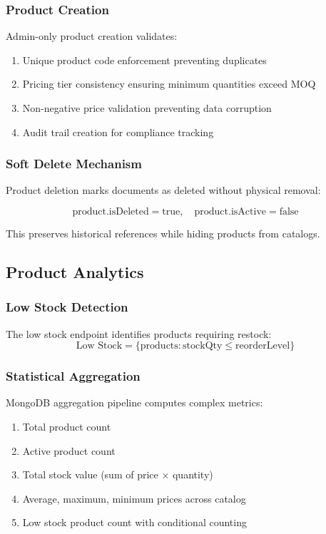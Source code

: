 \documentclass[conference]{IEEEtran}
\begin{document}
\subsubsection{Product Creation}
Admin-only product creation validates:
\begin{enumerate}
\item Unique product code enforcement preventing duplicates
\item Pricing tier consistency ensuring minimum quantities exceed MOQ
\item Non-negative price validation preventing data corruption
\item Audit trail creation for compliance tracking
\end{enumerate}

\subsubsection{Soft Delete Mechanism}
Product deletion marks documents as deleted without physical removal:

\begin{equation}
\text{product.isDeleted} = \text{true}, \quad \text{product.isActive} = \text{false}
\end{equation}

This preserves historical references while hiding products from catalogs.

\subsection{Product Analytics}

\subsubsection{Low Stock Detection}
The low stock endpoint identifies products requiring restock:
\begin{equation}
\text{Low Stock} = \{\text{products} : \text{stockQty} \leq \text{reorderLevel}\}
\end{equation}

\subsubsection{Statistical Aggregation}
MongoDB aggregation pipeline computes complex metrics:
\begin{enumerate}
\item Total product count
\item Active product count
\item Total stock value (sum of price × quantity)
\item Average, maximum, minimum prices across catalog
\item Low stock product count with conditional counting
\end{enumerate}
\end{document}
